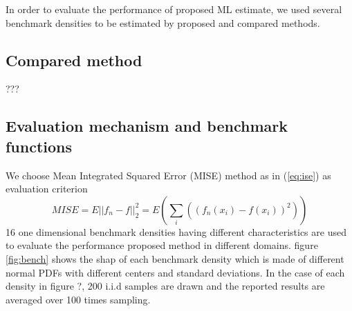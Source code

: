 In order to evaluate the performance of proposed ML estimate, we used several benchmark densities to be estimated by proposed and compared methods.
\subsection{Compared method}
???
\subsection{Evaluation mechanism and benchmark functions}
We choose Mean Integrated Squared Error (MISE) method as in (\ref{eq:ise}) as evaluation criterion 
\begin{equation}\label{eq:ise}
MISE = E||f_n-f||^2_2=E(\sum_i((f_n(x_i)-f(x_i))^2))
\end{equation}
16 one dimensional benchmark densities having different characteristics are used to evaluate the performance  proposed method in different domains. figure \ref{fig:bench} shows the shap of each benchmark density which is made of different normal PDFs with different centers and standard deviations.
In the case of each density in figure ?, 200 i.i.d samples are drawn and the reported results are averaged over 100 times sampling.
